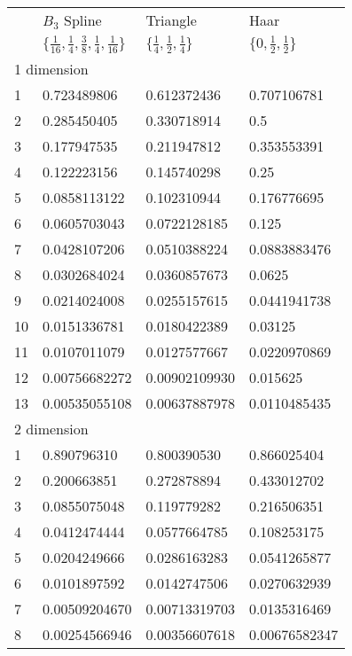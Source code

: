 \begin{table}[b]
\begin{tabular}{llll}
\hline
& $B_3$ Spline & Triangle & Haar\\
& $\{\frac{1}{16},\frac{1}{4},\frac{3}{8},\frac{1}{4},\frac{1}{16}\}$
& $\{\frac{1}{4},\frac{1}{2},\frac{1}{4}\}$
& $\{0,\frac{1}{2},\frac{1}{2}\}$ \\
\hline
\multicolumn{4}{l}{1 dimension}\\
\hline
1     & 0.723489806     & 0.612372436    & 0.707106781   \\
2     & 0.285450405	& 0.330718914    & 0.5           \\
3     & 0.177947535	& 0.211947812    & 0.353553391   \\
4     & 0.122223156	& 0.145740298    & 0.25          \\
5     & 0.0858113122	& 0.102310944    & 0.176776695   \\
6     & 0.0605703043	& 0.0722128185   & 0.125         \\
7     & 0.0428107206	& 0.0510388224   & 0.0883883476  \\
8     & 0.0302684024	& 0.0360857673   & 0.0625        \\
9     & 0.0214024008	& 0.0255157615   & 0.0441941738  \\
10    & 0.0151336781	& 0.0180422389   & 0.03125       \\
11    & 0.0107011079	& 0.0127577667   & 0.0220970869  \\
12    & 0.00756682272	& 0.00902109930  & 0.015625      \\
13    & 0.00535055108	& 0.00637887978  & 0.0110485435  \\
\hline
\multicolumn{4}{l}{2 dimension}\\
\hline
1     & 0.890796310     & 0.800390530     & 0.866025404     \\
2     & 0.200663851	& 0.272878894     & 0.433012702     \\
3     & 0.0855075048	& 0.119779282     & 0.216506351     \\
4     & 0.0412474444	& 0.0577664785    & 0.108253175     \\
5     & 0.0204249666	& 0.0286163283    & 0.0541265877    \\
6     & 0.0101897592	& 0.0142747506    & 0.0270632939    \\
7     & 0.00509204670   & 0.00713319703   & 0.0135316469    \\
8     & 0.00254566946   & 0.00356607618   & 0.00676582347   \\

\end{tabular}
\end{table}
